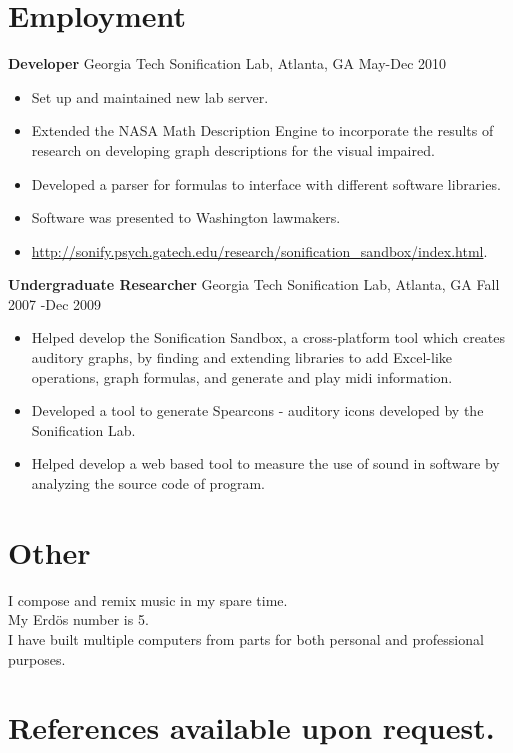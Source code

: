 \documentclass{res}
\begin{document}
\begin{resume}
\section{Employment}
% 
{\bf Developer} Georgia Tech Sonification Lab, Atlanta, GA May-Dec 2010
	\begin{itemize}
		\item Set up and maintained new lab server.
		\item Extended the NASA Math Description Engine to incorporate the results of research on developing graph descriptions for the visual impaired.
		\item Developed a parser for formulas to interface with different software libraries.
		\item Software was presented to Washington lawmakers.
		\item \url{http://sonify.psych.gatech.edu/research/sonification_sandbox/index.html}.
    \end{itemize}      
    
{\bf Undergraduate Researcher} Georgia Tech Sonification Lab, Atlanta, GA Fall 2007 -Dec 2009
	\begin{itemize}
		\item Helped develop the Sonification Sandbox, a cross-platform tool which creates auditory graphs, by finding and extending libraries to add Excel-like operations, graph formulas, and generate and play midi information.
		\item Developed a tool to generate Spearcons - auditory icons developed by the Sonification Lab.
		\item Helped develop a web based tool to measure the use of sound in software by analyzing the source code of program.
    \end{itemize}      
    



\section{Other}
I compose and remix music in my spare time. \\
My Erd\"{o}s number is 5.\\
I have built multiple computers from parts for both personal and professional purposes.



\end{resume} 
\section{References available upon request.}
\end{document}
